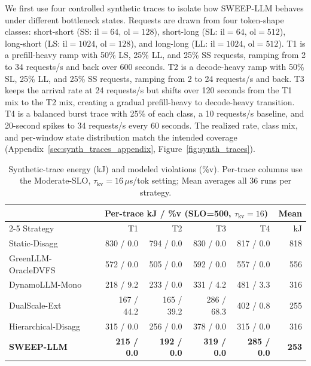 We first use four controlled synthetic traces to isolate how SWEEP-LLM behaves under different bottleneck states.
Requests are drawn from four token-shape classes: short-short (SS: $\mathrm{il}=64$, $\mathrm{ol}=128$), short-long (SL: $\mathrm{il}=64$, $\mathrm{ol}=512$), long-short (LS: $\mathrm{il}=1024$, $\mathrm{ol}=128$), and long-long (LL: $\mathrm{il}=1024$, $\mathrm{ol}=512$).
T1 is a prefill-heavy ramp with 50\% LS, 25\% LL, and 25\% SS requests, ramping from 2 to 34 requests/s and back over 600 seconds.
T2 is a decode-heavy ramp with 50\% SL, 25\% LL, and 25\% SS requests, ramping from 2 to 24 requests/s and back.
T3 keeps the arrival rate at 24 requests/s but shifts over 120 seconds from the T1 mix to the T2 mix, creating a gradual prefill-heavy to decode-heavy transition.
T4 is a balanced burst trace with 25\% of each class, a 10 requests/s baseline, and 20-second spikes to 34 requests/s every 60 seconds.
The realized rate, class mix, and per-window state distribution match the intended coverage (Appendix~\ref{sec:synth_traces_appendix}, Figure~\ref{fig:synth_traces}).

\begin{table}[t]
\centering
\caption{Synthetic-trace energy (kJ) and modeled violations (\%v). Per-trace columns use the Moderate-SLO, $\tau_{\mathrm{kv}}{=}16\,\mu$s/tok setting; Mean averages all $36$ runs per strategy.}
\label{tab:section42_main}
\small
\setlength{\tabcolsep}{4pt}
\begin{tabular}{@{}lrrrrr@{}}
\toprule
 & \multicolumn{4}{c}{Per-trace kJ / \%v (SLO=500, $\tau_{\mathrm{kv}}{=}16$)} & Mean \\
\cmidrule(lr){2-5}
Strategy & T1 & T2 & T3 & T4 & kJ \\
\midrule
Static-Disagg          & 830 / 0.0 & 794 / 0.0 & 830 / 0.0 & 817 / 0.0 & 818 \\
GreenLLM-OracleDVFS    & 572 / 0.0 & 505 / 0.0 & 592 / 0.0 & 557 / 0.0 & 556 \\
DynamoLLM-Mono         & 218 / 9.2 & 233 / 0.0 & 331 / 4.2 & 481 / 3.3 & 316 \\
DualScale-Ext          & 167 / 44.2 & 165 / 39.2 & 286 / 68.3 & 402 / 0.8 & 255 \\
Hierarchical-Disagg    & 315 / 0.0 & 256 / 0.0 & 378 / 0.0 & 315 / 0.0 & 316 \\
\textbf{SWEEP-LLM}     & \textbf{215 / 0.0} & \textbf{192 / 0.0} & \textbf{319 / 0.0} & \textbf{285 / 0.0} & \textbf{253} \\
\bottomrule
\end{tabular}
\end{table}

